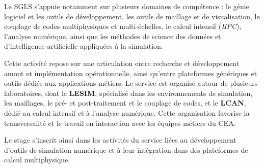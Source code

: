 Le SGLS s'appuie notamment sur plusieurs domaines de compétence :
le génie logiciel et les outils de développement, les outils de
maillage et de visualisation, le couplage de codes multiphysiques et
multi-échelles, le calcul intensif (\textit{HPC}), l'analyse numérique,
ainsi que les méthodes de science des données et d'intelligence
artificielle appliquées à la simulation.

Cette activité repose sur une articulation entre recherche et
développement amont et implémentation opérationnelle, ainsi qu'entre
plateformes génériques et outils dédiés aux applications métiers.
Le service est organisé autour de plusieurs laboratoires, dont le
\textbf{LESIM}, spécialisé dans les environnements de simulation,
les maillages, le pré- et post-traitement et le couplage de codes,
et le \textbf{LCAN}, dédié au calcul intensif et à l'analyse
numérique. Cette organisation favorise la transversalité et le
travail en interaction avec les équipes métiers du CEA.

Le stage s'inscrit ainsi dans les activités du service liées au
développement d'outils de simulation numérique et à leur intégration
dans des plateformes de calcul multiphysique.


